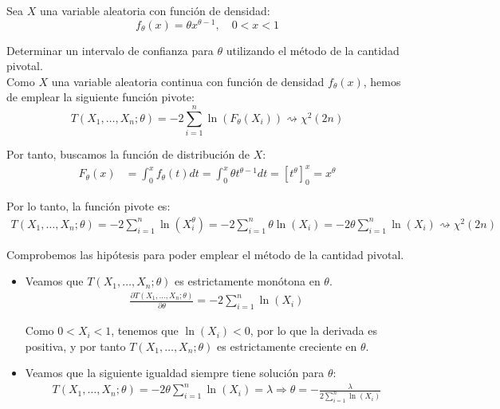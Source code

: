 \begin{ejemplo}
    Sea $X$ una variable aleatoria con función de densidad:
    \begin{equation*}
        f_\theta(x) = \theta x^{\theta - 1}, \quad 0 < x < 1
    \end{equation*}

    Determinar un intervalo de confianza para $\theta$ utilizando el método de la cantidad pivotal.\\

    Como $X$ una variable aleatoria continua con función de densidad $f_\theta(x)$, hemos de emplear la siguiente función pivote:
    \begin{equation*}
        T(X_1, \ldots, X_n; \theta) = -2\sum_{i=1}^{n} \ln(F_\theta(X_i)) \rightsquigarrow \chi^2(2n)
    \end{equation*}

    Por tanto, buscamos la función de distribución de $X$:
    \begin{align*}
        F_\theta(x) &= \int_{0}^{x} f_\theta(t) dt = \int_{0}^{x} \theta t^{\theta - 1} dt = \left[t^\theta\right]_{0}^{x} = x^\theta
    \end{align*}

    Por lo tanto, la función pivote es:
    \begin{align*}
        T(X_1, \ldots, X_n; \theta) = -2\sum_{i=1}^{n} \ln(X_i^\theta) = -2\sum_{i=1}^{n} \theta \ln(X_i) = -2\theta \sum_{i=1}^{n} \ln(X_i)\rightsquigarrow \chi^2(2n)
    \end{align*}

    Comprobemos las hipótesis para poder emplear el método de la cantidad pivotal.
    \begin{itemize}
        \item Veamos que $T(X_1, \ldots, X_n; \theta)$ es estrictamente monótona en $\theta$.
        \begin{align*}
            \frac{\partial T(X_1, \ldots, X_n; \theta)}{\partial \theta} = -2\sum_{i=1}^{n} \ln(X_i)
        \end{align*}

        Como $0 < X_i < 1$, tenemos que $\ln(X_i) < 0$, por lo que la derivada es positiva, y por tanto $T(X_1, \ldots, X_n; \theta)$ es estrictamente creciente en $\theta$.

        \item Veamos que la siguiente igualdad siempre tiene solución para $\theta$:
        \begin{align*}
            T(X_1, \ldots, X_n; \theta) = -2\theta \sum_{i=1}^{n} \ln(X_i) = \lambda
            \Longrightarrow
            \theta = -\frac{\lambda}{2\sum\limits_{i=1}^{n} \ln(X_i)}
        \end{align*}
    \end{itemize}


\end{ejemplo}
